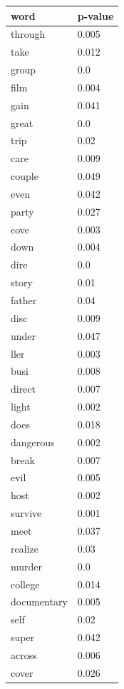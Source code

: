\documentclass[12pt, oneside]{article}   	%
\begin{document}
\begin{table}
\begin{tabular}[t]{l|l}
\end{tabular}
\begin{tabular}[t]{l|l}
\textbf{word}        & \textbf{p-value} \\ \hline
through     & 0.005    \\
take        & 0.012    \\
group       & 0.0      \\
film        & 0.004    \\
gain        & 0.041    \\
great       & 0.0      \\
trip        & 0.02     \\
care        & 0.009    \\
couple      & 0.049    \\
even        & 0.042    \\
party       & 0.027    \\
cove        & 0.003    \\
down        & 0.004    \\
dire        & 0.0      \\
story       & 0.01     \\
father      & 0.04     \\
disc        & 0.009    \\
under       & 0.047    \\
ller        & 0.003    \\
busi        & 0.008    \\
direct      & 0.007    \\
light       & 0.002    \\
does        & 0.018    \\
dangerous   & 0.002    \\
break       & 0.007    \\
evil        & 0.005    \\
host        & 0.002    \\
survive     & 0.001    \\
meet        & 0.037    \\
realize     & 0.03     \\
murder      & 0.0      \\
college     & 0.014    \\
documentary & 0.005    \\
self        & 0.02     \\
super       & 0.042    \\
across      & 0.006    \\
cover       & 0.026    \\

\end{tabular}
\end{table}
\end{document}

